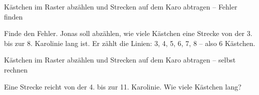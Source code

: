 \begin{aufgabe}{Kästchen im Raster abzählen und Strecken auf dem Karo abtragen – Fehler finden}
\begin{teile}
\teil Finde den Fehler. Jonas soll abzählen, wie viele Kästchen eine Strecke von der 3. bis zur 8. Karolinie lang ist. Er zählt die Linien: 3, 4, 5, 6, 7, 8 – also 6 Kästchen.
\end{teile}
\end{aufgabe}

\begin{aufgabe}{Kästchen im Raster abzählen und Strecken auf dem Karo abtragen – selbst rechnen}
\begin{teile}
\teil Eine Strecke reicht von der 4. bis zur 11. Karolinie. Wie viele Kästchen lang? \leerfeld[Kästchen]
\end{teile}
\end{aufgabe}
